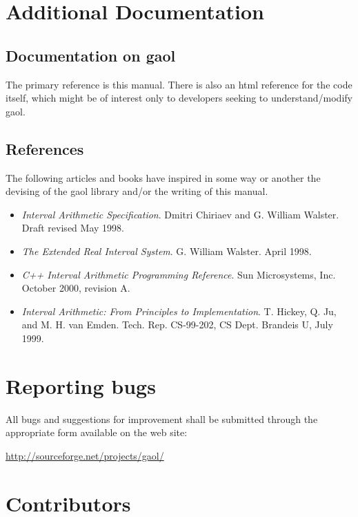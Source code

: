 \documentclass{manual}
\begin{document}
\chapter{Additional Documentation}

\section{Documentation on gaol}

The primary reference is this manual. There is also an html reference
for the code itself, which might be of interest only to developers
seeking to understand/modify gaol.

\section{References}
The following articles and books have inspired in some way or another the
devising of the gaol library and/or the writing of this manual.

\begin{itemize}
\item \emph{Interval Arithmetic Specification}. Dmitri Chiriaev and G.\:
William Walster. Draft revised May 1998.
\item \emph{The Extended Real Interval System}. G.\: William
Walster. April 1998.
\item \emph{C++ Interval Arithmetic Programming Reference}. Sun Microsystems,
Inc. October 2000, revision A.
\item \emph{Interval Arithmetic: From Principles to Implementation}. T.\:
Hickey, Q.\: Ju, and M.\: H.\: van Emden. Tech. Rep. CS-99-202,
CS Dept. Brandeis U, July 1999.
\end{itemize}

\chapter{Reporting bugs}

All bugs and suggestions for improvement shall be submitted through the appropriate form
available on the web site:

\begin{center}
  \url{http://sourceforge.net/projects/gaol/}
\end{center}

\chapter{Contributors}
\end{document}
